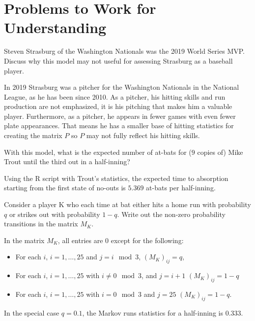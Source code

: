 \documentclass[12pt]{article}
\begin{document}
\hr

\section*{Problems to Work for Understanding}
\renewcommand{\theexerciseseries}{}
\renewcommand{\theexercise}{\arabic{exercise}}

\begin{exercise}
    Steven Strasburg of the Washington Nationals was the 2019 World
    Series MVP\@.  Discuss why this model may not useful for assessing
    Strasburg as a baseball player.
\end{exercise}
\begin{solution}
    In 2019 Strasburg was a pitcher for the Washington Nationals in the
    National League, as he has been since 2010.  As a pitcher, his
    hitting skills and run production are not emphasized, it is his
    pitching that makes him a valuable player.  Furthermore, as a
    pitcher, he appears in fewer games with even fewer plate
    appearances.  That means he has a smaller base of hitting statistics
    for creating the matrix \( P \) so \( P \) may not fully reflect his
    hitting skills.
\end{solution}

\begin{exercise}
    With this model, what is the expected number of at-bats for (\( 9 \)
    copies of) Mike Trout until the third out in a half-inning?
\end{exercise}
\begin{solution}
    Using the R script with Trout's statistics, the expected time to
    absorption starting from the first state of no-outs is \( 5.369 \)
    at-bats per half-inning.
\end{solution}

\begin{exercise}
    Consider a player K who each time at bat either hits a home run with
    probability \( q \) or strikes out with probability \( 1 - q \).
    Write out the non-zero probability transitions in the matrix \( M_{K}
    \).
\end{exercise}
\begin{solution}
    In the matrix \( M_{K} \), all entries are \( 0 \) except for the
    following:
    \begin{itemize}
        \item
            For each \( i \), \( i= 1,\dots, 25 \) and \( j=i \mod 3 \),
            \( (M_K)_{ij} = q \),
        \item
            For each \( i \), \( i= 1,\dots, 25 \) with \( i \ne 0 \mod
            3 \), and \( j=i+1 \) \( (M_K)_{ij} = 1-q \)
        \item
            For each \( i \), \( i= 1,\dots, 25 \) with \( i = 0 \mod 3 \)
            and \( j=25 \) \( (M_K)_{ij} = 1-q \).
    \end{itemize}
    In the special case \( q = 0.1 \), the Markov runs statistics for a
    half-inning is \( 0.333 \).
\end{solution}
\end{document}
